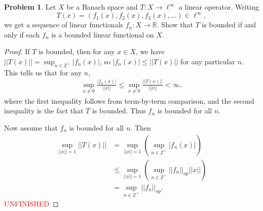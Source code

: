 \documentclass[12pt]{article}
\theoremstyle{definition}
\newtheorem{ex}{Problem}
\begin{document}
\begin{ex}
	Let $X$ be a Banach space and $T : X \to \ell^\infty$ a linear operator.
	Writing \begin{equation*}
		T(x) = (f_1(x), f_2(x), f_3(x), \dots) \in \ell^\infty,
	\end{equation*}
	we get a sequence of linear functionals $f_n : X \to \mathbb{R}$.
	Show that $T$ is bounded if and only if each $f_n$ is a bounded linear functional on $X$.
\end{ex}
\begin{proof}
	If $T$ is bounded, then for any $x \in X$, we have $||T(x)|| = \sup_{n \in \mathbb{Z}^+} |f_n(x)|$, so $|f_n(x)| \leq ||T(x)||$ for any particular $n$.
	This tells us that for any $n$, \begin{align*}
		\sup_{x \neq 0} \frac{|f_n(x)|}{||x||} \leq \sup_{x \neq 0} \frac{||T(x)||}{||x||} < \infty,
	\end{align*}
	where the first inequality follows from term-by-term comparison, and the second inequality is the fact that $T$ is bounded.
	Thus $f_n$ is bounded for all $n$.

	Now assume that $f_n$ is bounded for all $n$.
	Then \begin{align*}
		\sup_{||x||=1}||T(x)|| & = \sup_{||x||=1}\left(\sup_{n \in \mathbb{Z}^+}|f_n(x)| \right)             \\
		                       & \leq \sup_{||x||=1}\left(\sup_{n \in \mathbb{Z}^+}||f_n||_{op}||x|| \right) \\
		                       & = \sup_{n \in \mathbb{Z}^+}||f_n||_{op}.
	\end{align*}
	\textcolor{red}{UNFINISHED}
\end{proof}
\end{document}
